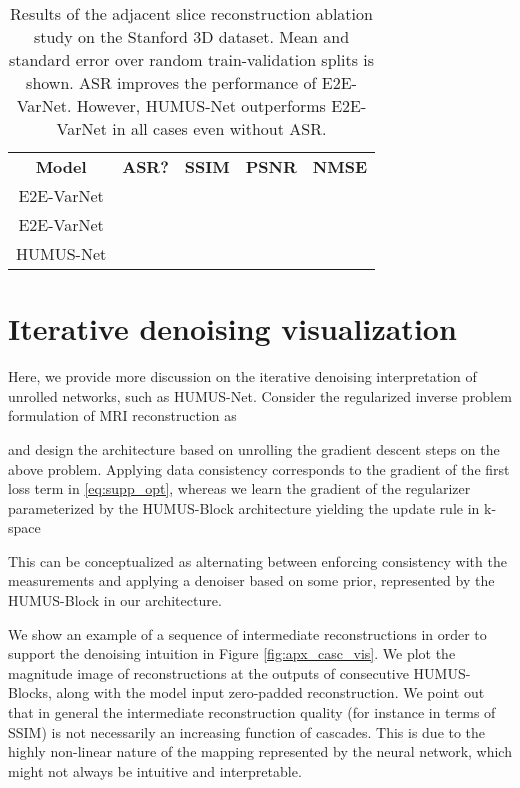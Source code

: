 \begin{table}
\centering
\begin{tabular}{ |c|c|c|c|c|  }
	\hline
	\textbf{Model} & \textbf{ASR?}	& \textbf{SSIM}&\textbf{PSNR} & \textbf{NMSE} \\
	\hhline{|=|=|=|=|=|}
	E2E-VarNet & \xmark & &&\\
	E2E-VarNet & \checkmark & && \\
	HUMUS-Net & \xmark &  &&\\
	\hline
\end{tabular}
\caption{Results of the adjacent slice reconstruction ablation study on the Stanford 3D dataset. Mean and standard error over  random train-validation splits is shown. ASR improves the performance of E2E-VarNet. However, HUMUS-Net outperforms E2E-VarNet in all cases even without ASR.  \label{tab:apx_abl_asr}}	
\end{table}

\section{Iterative denoising visualization \label{sec:apx_iter}}
	Here, we provide more discussion on the iterative denoising interpretation of unrolled networks, such as HUMUS-Net. Consider the regularized inverse problem formulation of MRI reconstruction as 
	
  and design the architecture based on unrolling the gradient descent steps on the above problem. Applying data consistency corresponds to the gradient of the first loss term in \eqref{eq:supp_opt},
whereas we learn the gradient of the regularizer parameterized by the HUMUS-Block architecture yielding the update rule in k-space
   
This can be conceptualized as alternating between enforcing consistency with the measurements and applying a denoiser based on some prior, represented by the HUMUS-Block in our architecture.
	
	We show an example of a sequence of intermediate reconstructions in order to support the denoising intuition in Figure \ref{fig:apx_casc_vis}. We plot the magnitude image of reconstructions at the outputs of consecutive HUMUS-Blocks, along with the model input zero-padded reconstruction. We point out that in general  the intermediate reconstruction quality (for instance in terms of SSIM) is not necessarily an increasing function of cascades. This is due to the highly non-linear nature of the mapping represented by the neural network, which might not always be intuitive and interpretable.

